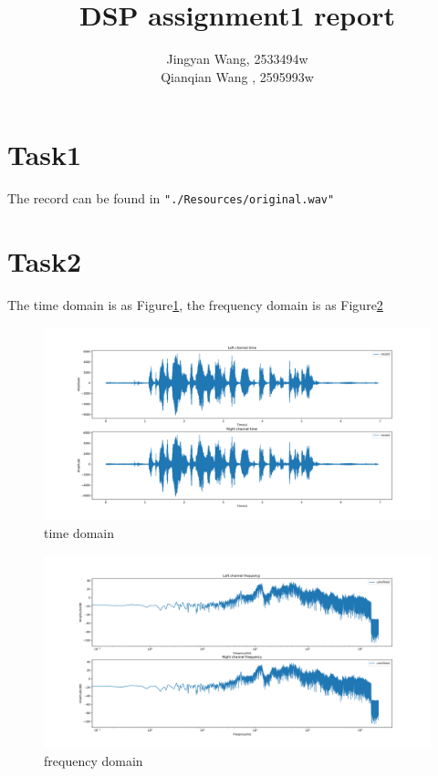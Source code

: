 \documentclass[a4paper,12pt]{article}
\begin{document}
%
   \title{\textbf{DSP assignment1 report}}

   \author{Jingyan Wang, 2533494w \\ Qianqian Wang , 2595993w}
          
   \date{}

   \maketitle
   
   \tableofcontents
 
  \newpage

\section{Task1}
The record can be found in \lstinline|"./Resources/original.wav"|
\section{Task2}
The time domain is as Figure\ref{fig_recordT}, the frequency domain is as Figure\ref{fig_recordF}
\begin{figure}[h]   
	\centering 
	\includegraphics[width=12cm]{../Output/Figures/recordT} 
	\caption{time domain}   
	\label{fig_recordT}
\end{figure}
\begin{figure}[h]   
	\centering 
	\includegraphics[width=12cm]{../Output/Figures/recordF} 
	\caption{frequency domain}   
	\label{fig_recordF}
\end{figure}
\end{document}
